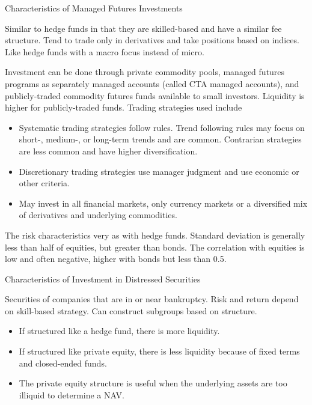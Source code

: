 \documentclass[../custom]{flashcards}
\begin{document}
\begin{flashcard}{Characteristics of Managed Futures Investments}
    \begin{flushleft}
        Similar to hedge funds in that they are skilled-based and have a similar fee structure. Tend to trade only in derivatives and take positions based on indices. Like hedge funds with a macro focus instead of micro.\newline

        Investment can be done through private commodity pools, managed futures programs as separately managed accounts (called CTA managed accounts), and publicly-traded commodity futures funds available to small investors. Liquidity is higher for publicly-traded funds. Trading strategies used include
        \begin{itemize}
            \item Systematic trading strategies follow rules. Trend following rules may focus on short-, medium-, or long-term trends and are common. Contrarian strategies are less common and have higher diversification.
            \item Discretionary trading strategies use manager judgment and use economic or other criteria.
            \item May invest in all financial markets, only currency markets or a diversified mix of derivatives and underlying commodities.
        \end{itemize}
        The risk characteristics very as with hedge funds. Standard deviation is generally less than half of equities, but greater than bonds. The correlation with equities is low and often negative, higher with bonds but less than 0.5.
    \end{flushleft}
\end{flashcard}

\begin{flashcard}{Characteristics of Investment in Distressed Securities}
    \begin{flushleft}
        Securities of companies that are in or near bankruptcy. Risk and return depend on skill-based strategy. Can construct subgroups based on structure.
        \begin{itemize}
            \item If structured like a hedge fund, there is more liquidity.
            \item If structured like private equity, there is less liquidity because of fixed terms and closed-ended funds.
            \item The private equity structure is useful when the underlying assets are too illiquid to determine a NAV.
        \end{itemize}
    \end{flushleft}
\end{flashcard}
\end{document}
